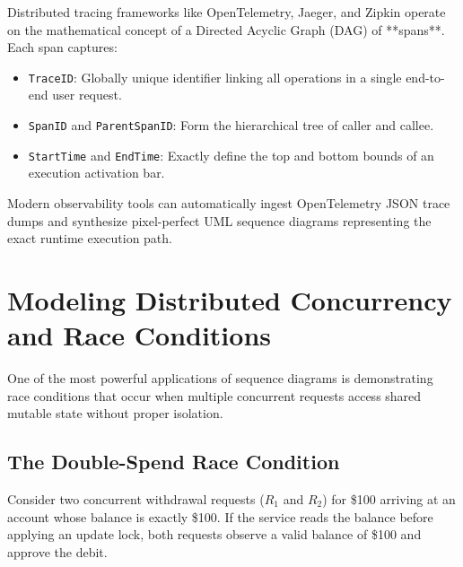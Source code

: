 \begin{underthehoodbox}
Distributed tracing frameworks like OpenTelemetry, Jaeger, and Zipkin operate on the mathematical concept of a Directed Acyclic Graph (DAG) of **spans**. Each span captures:
\begin{itemize}
  \item \texttt{TraceID}: Globally unique identifier linking all operations in a single end-to-end user request.
  \item \texttt{SpanID} and \texttt{ParentSpanID}: Form the hierarchical tree of caller and callee.
  \item \texttt{StartTime} and \texttt{EndTime}: Exactly define the top and bottom bounds of an execution activation bar.
\end{itemize}
Modern observability tools can automatically ingest OpenTelemetry JSON trace dumps and synthesize pixel-perfect UML sequence diagrams representing the exact runtime execution path.
\end{underthehoodbox}

\section{Modeling Distributed Concurrency and Race Conditions}

One of the most powerful applications of sequence diagrams is demonstrating race conditions that occur when multiple concurrent requests access shared mutable state without proper isolation.

\subsection{The Double-Spend Race Condition}

Consider two concurrent withdrawal requests ($R_1$ and $R_2$) for \$100 arriving at an account whose balance is exactly \$100. If the service reads the balance before applying an update lock, both requests observe a valid balance of \$100 and approve the debit.

